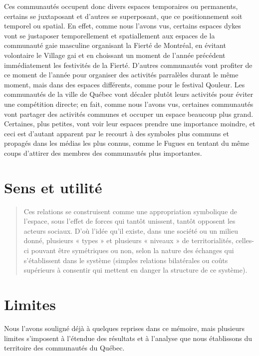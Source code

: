 Ces communautés occupent donc divers espaces temporaires ou permanents, certains se juxtaposant et d'autres se superposant, que ce positionnement soit temporel ou spatial.
En effet, comme nous l'avons vus, certains espaces dykes vont se justaposer temporellement et spatiallement aux espaces de la communauté gaie masculine organisant la Fierté de Montréal, en évitant volontaire le Village gai et en choissant un moment de l'année précédent immédiatement les festivités de la Fierté.
D'autres communautés vont profiter de ce moment de l'année pour organiser des activités parralèles durant le même moment, mais dans des espaces différents, comme pour le festival Qouleur.
Les communautés de la ville de Québec vont décaler plutôt leurs activités pour éviter une compétition directe; en fait, comme nous l'avons vus, certaines communautés vont partager des activités communes et occuper un espace beaucoup plus grand.
Certaines, plus petites, vont voir leur espaces prendre une importance moindre, et ceci est d'autant apparent par le recourt à des symboles plus communs et propagés dans les médias les plus connus, comme le Fugues en tentant du même coups d'attirer des membres des communautés plus importantes.

\section*{Sens et utilité}
\label{sec:sens_et_utilit_}

\begin{quotation}
  Ces relations se construisent comme une appropriation symbolique de l'espace, sous l'effet de forces qui tantôt unissent, tantôt opposent les acteurs sociaux.
  D'où l'idée qu'il existe, dans une société ou un milieu donné, plusieurs « types » et plusieurs « niveaux » de territorialités, celles-ci pouvant être symétriques ou non, selon la nature des échanges qui s'établissent dans le système (simples relations bilatérales ou coûts supérieurs à consentir qui mettent en danger la structure de ce système).\citep[41]{Courville1991}
\end{quotation}

\section{Limites}
\label{sec:limites}

Nous l'avons souligné déjà à quelques reprises dans ce mémoire, mais plusieurs limites s'imposent à l'étendue des résultats et à l'analyse que nous établissons du territoire des communautés \lgbt{} du Québec.

